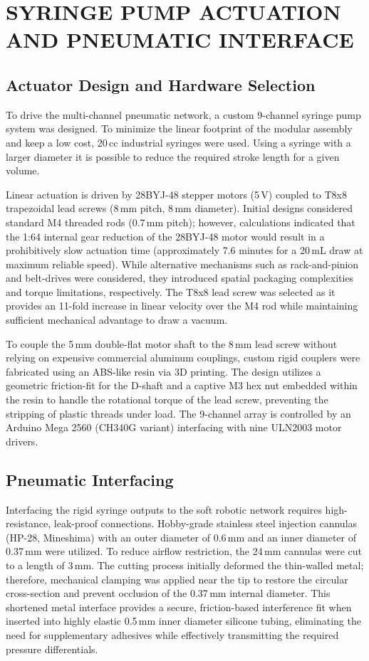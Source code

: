 
\section{SYRINGE PUMP ACTUATION AND PNEUMATIC INTERFACE}

\subsection{Actuator Design and Hardware Selection}
To drive the multi-channel pneumatic network, a custom 9-channel syringe pump system was 
designed. To minimize the linear footprint of the modular assembly and keep a low cost, 20\,cc industrial syringes were used. Using a syringe with a larger 
diameter it is possible to reduce the required stroke length for a given volume. 

Linear actuation is driven by 28BYJ-48 stepper motors (5\,V) coupled to T8x8 trapezoidal lead screws (8\,mm pitch, 8\,mm diameter). Initial designs considered standard M4 threaded rods (0.7\,mm pitch); however, calculations indicated that the 1:64 internal gear reduction of the 28BYJ-48 motor would result in a prohibitively slow actuation time (approximately 7.6 minutes for a 20\,mL draw at maximum reliable speed). While alternative mechanisms such as rack-and-pinion and belt-drives were considered, they introduced spatial packaging complexities and torque limitations, respectively. The T8x8 lead screw was selected as it provides an 11-fold increase in linear velocity over the M4 rod while maintaining sufficient mechanical advantage to draw a vacuum. 

To couple the 5\,mm double-flat motor shaft to the 8\,mm lead screw without relying on expensive commercial aluminum couplings, custom rigid couplers were fabricated using an ABS-like resin via 3D printing. The design utilizes a geometric friction-fit for the D-shaft and a captive M3 hex nut embedded within the resin to handle the rotational torque of the lead screw, preventing the stripping of plastic threads under load. The 9-channel array is controlled by an Arduino Mega 2560 (CH340G variant) interfacing with nine ULN2003 motor drivers.

\subsection{Pneumatic Interfacing}
Interfacing the rigid syringe outputs to the soft robotic network requires high-resistance, leak-proof connections. Hobby-grade stainless steel injection cannulas (HP-28, Mineshima) with an outer diameter of 0.6\,mm and an inner diameter of 0.37\,mm were utilized. To reduce airflow restriction, the 24\,mm cannulas were cut to a length of 3\,mm. The cutting process initially deformed the thin-walled metal; therefore, mechanical clamping was applied near the tip to restore the circular cross-section and prevent occlusion of the 0.37\,mm internal diameter. This shortened metal interface provides a secure, friction-based interference fit when inserted into highly elastic 0.5\,mm inner diameter silicone tubing, eliminating the need for supplementary adhesives while effectively transmitting the required pressure differentials.